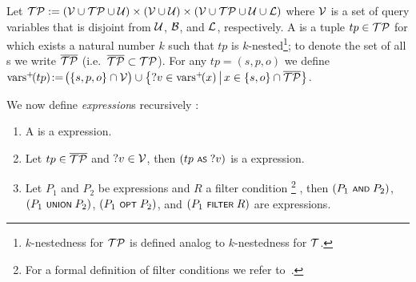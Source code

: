 	Let $\mathcal{TP} := (\mathcal{V} \cup \mathcal{TP} \cup \mathcal{U}) \times (\mathcal{V} \cup \mathcal{U}) \times (\mathcal{V} \cup \mathcal{TP} \cup \mathcal{U} \cup \mathcal{L})$ where $\mathcal{V}$ is a set of query variables that is disjoint from $\mathcal{U}$, $\mathcal{B}$, and $\mathcal{L}$, respectively.
A \emph{\TPplus} is a tuple $tp \in \mathcal{TP}$ for which exists a natural number $k$ such that $tp$ is $k$-nested\footnote{$k$-nestedness for $\mathcal{TP}$ is defined analog to $k$-nestedness for $\mathcal{T}$.}; to denote the set of all {\TPplus}s we write $\overline{\mathcal{TP}}$ (i.e.~$\overline{\mathcal{TP}} \subset \mathcal{TP}$).
	For any {\TPplus} $tp \!=\! (s,p,o)$ we define $\mathrm{vars}^+\!(tp) \!:=\! \bigl( \lbrace s,p,o \rbrace \cap \mathcal{V} \bigr) \cup \big\lbrace ?v \in \mathrm{vars}^+\!(x) \,\big|\, x \in \lbrace s,o \rbrace \cap \overline{\mathcal{TP}} \big\rbrace$.

	We now define \emph{{\SPARQLplus} expression}s recursively :
\begin{enumerate}
	\item A \emph{\TPplus} is a {\SPARQLplus} expression.
	\item Let $tp \in \overline{\mathcal{TP}}$ and $?v \in \mathcal{V}$, then $(tp \text{ \normalfont\scriptsize\textsf{AS} } ?v)$ is a {\SPARQLplus} expression.
	\item Let $P_1$ and $P_2$ be {\SPARQLplus} expressions and $R$ a filter condition%
		\footnote{For a formal definition of
		filter conditions we refer to~\cite{Perez09:SemanticsAndComplexityOfSPARQL}.}%
	, then $(P_1 \text{ \normalfont\scriptsize\textsf{AND} } P_2)$, $(P_1 \text{ \normalfont\scriptsize\textsf{UNION} } P_2)$, $(P_1 \text{ \normalfont\scriptsize\textsf{OPT} } P_2)$, and $(P_1 \text{ \normalfont\scriptsize\textsf{FILTER} } R)$ are {\SPARQLplus} expressions.
\end{enumerate}


